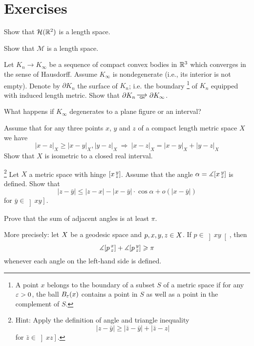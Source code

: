 \section*{Exercises}






\begin{pr} \label{pr:H(R^2)-length-space}
Show that $\mathcal{H}({\mathbb{R}^2})$ is a length space.
\end{pr}

\begin{pr}\label{pr:M-length-space}
Show that $\mathcal{M}$ is a length space.
\end{pr}



\begin{pr}\label{pr:H>GH-boundary}
Let $K_n\to K_\infty$ be a sequence of compact convex bodies in $\mathbb{R}^3$ 
which converges in the sense of Hausdorff.
Assume $K_\infty$ is nondegenerate (i.e., its interior is not empty).
Denote by $\partial K_n$ the surface of $K_n$; i.e. the boundary%
\footnote{ A point $x$ belongs to the boundary of a subset $S$ of a metric space if for any $\varepsilon>0$,
the ball $B_\varepsilon(x)$ contains a point in $S$ as well as a point in the complement of $S$.} 
 of $K_n$ equipped with induced length metric.
Show that $\partial K_n\GHto \partial K_\infty$.

What happens if $K_\infty$ degenerates to a plane figure or an interval?
\end{pr}

\begin{pr}\label{pr:trig-inq=>interval}
Assume that for any three points $x$, $y$ and $z$ of a compact length metric space $X$ we have 
$$|x-z|_X\ge |x-y|_X, |y-z|_X\ \Longrightarrow\  |x-z|_X= |x-y|_X+ |y-z|_X$$
Show that $X$ is isometric to a closed real interval.
\end{pr}



\begin{pr}\label{pr:1-st-var}%
\footnote{Hint: Apply the definition of angle and triangle inequality
$$|z-\bar y|\ge|\bar z-\bar y|+ |\bar z -z|$$ 
for $\bar z\in  \left]xz\right]$.}
Let $X$ a metric space with hinge $[x\,{}^{y}_{z}]$.
Assume that the angle $\alpha=\measuredangle[x\,{}^{y}_{z}]$ is defined.
Show that
$$|z-\bar y|\le |z-x|-|x-\bar y|\cdot\cos\alpha+o(|x-\bar y|)$$
for $\bar y\in \left]xy\right]$.
\end{pr}

\begin{pr}\label{pr:adj-angles} Prove that the sum of adjacent angles is at least $\pi$.

More precisely: let ${X}$ be a geodesic space and $p,x,y,z\in {X}$.
If $p\in \left] x y \right[$, then 
\[\measuredangle[p\,{}^{x}_{z}]+\measuredangle[p\,{}^{y}_{z}]\geqslant \pi\]
whenever  each angle on the left-hand side is defined.
\end{pr}


 



